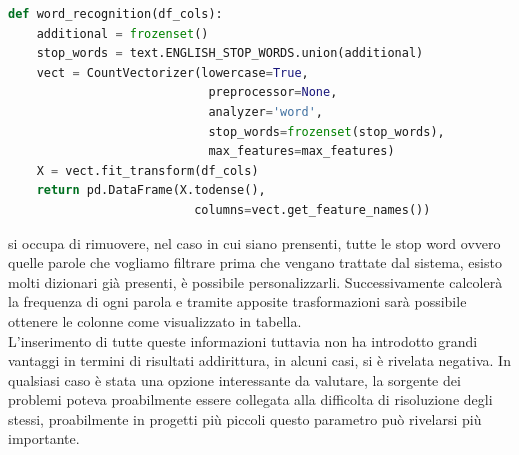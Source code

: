 \documentclass[%
    corpo=12pt,
    twoside,
    oldstyle,
    autoretitolo,
    greek,
    evenboxes,
]{toptesi}
\begin{document}
\begin{lstlisting}[language=Python, frame=single, basicstyle=\small]
  def word_recognition(df_cols):
    additional = frozenset()
    stop_words = text.ENGLISH_STOP_WORDS.union(additional)
    vect = CountVectorizer(lowercase=True, 
                            preprocessor=None, 
                            analyzer='word', 
                            stop_words=frozenset(stop_words),
                            max_features=max_features)
    X = vect.fit_transform(df_cols)
    return pd.DataFrame(X.todense(), 
                          columns=vect.get_feature_names())
\end{lstlisting}
si occupa di rimuovere, nel caso in cui siano prensenti, tutte le stop word ovvero quelle parole che vogliamo filtrare prima che vengano trattate dal sistema, esisto molti dizionari già presenti, è possibile personalizzarli. Successivamente calcolerà la frequenza di ogni parola e tramite apposite trasformazioni sarà possibile ottenere le colonne come visualizzato in tabella.\\
L'inserimento di tutte queste informazioni tuttavia non ha introdotto grandi vantaggi in termini di risultati addirittura, in alcuni casi, si è rivelata negativa. In qualsiasi caso è stata una opzione interessante da valutare, la sorgente dei problemi poteva proabilmente essere collegata alla difficolta di risoluzione degli stessi, proabilmente in progetti più piccoli questo parametro può rivelarsi più importante.
\end{document}
